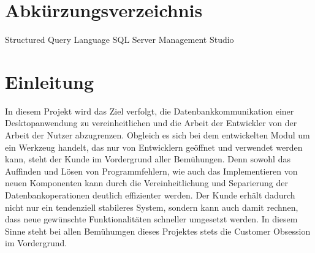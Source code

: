 \documentclass[11pt,toc=sectionentrywithoutdots, 
headheight=44pt, headings=optiontoheadandtoc, hyperfootnotes=false, hypertexnames=false]{scrartcl}
\begin{document}
\newpage
\setcounter{page}{1}


\tableofcontents


\setcounter{secnumdepth}{0}

\newpage

{}
\listoffigures




\newpage

{}
\listoftables
\newpage


\section{Abkürzungsverzeichnis}


\begin{acronym}[xxxxxxx]

 {Structured Query Language}
 {SQL Server Management Studio}

\end{acronym}
\newpage

{}
\printglossary[nonumberlist]
\newpage


\setcounter{secnumdepth}{1}
\setcounter{secnumdepth}{4}

\section{Einleitung}
In diesem Projekt wird das Ziel verfolgt, die Datenbankkommunikation einer Desktopanwendung zu vereinheitlichen und die Arbeit der Entwickler von der Arbeit der Nutzer abzugrenzen. Obgleich es sich bei dem entwickelten Modul um ein Werkzeug handelt, das nur von Entwicklern geöffnet und verwendet werden kann, steht der Kunde im Vordergrund aller Bemühungen. Denn sowohl das Auffinden und Lösen von Programmfehlern, wie auch das Implementieren von neuen Komponenten kann durch die Vereinheitlichung und Separierung der Datenbankoperationen deutlich effizienter werden. Der Kunde erhält dadurch nicht nur ein tendenziell stabileres System, sondern kann auch damit rechnen, dass neue gewünschte Funktionalitäten schneller umgesetzt werden. In diesem Sinne steht bei allen Bemühumgen dieses Projektes stets die \gls{Customer Obsession} im Vordergrund.
\end{document}
